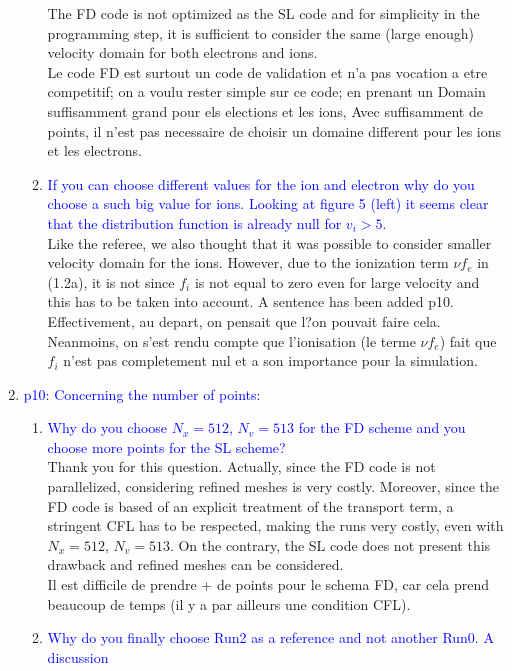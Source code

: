 \documentclass{article}
\begin{document}
\begin{enumerate}
\begin{enumerate}
The FD code is not optimized as the SL code and for simplicity in the programming step, 
it is sufficient to consider the same (large enough) velocity domain for both electrons and ions. \\
{\small Le code FD est surtout un code de validation et n'a pas vocation a etre competitif; on a voulu rester simple sur ce code; en prenant un Domain suffisamment grand pour els elections et les ions,
Avec suffisamment de points, il n'est pas necessaire de choisir un domaine different pour les ions et les electrons.}
\item \textcolor{blue}{If you can choose different values for the ion and electron why do you choose a such big value for ions. Looking at figure 5 (left) it seems clear that the distribution function is already null for $v_i > 5$.}\\
Like the referee, we also thought that it was possible to consider smaller velocity domain for the ions. However, due to the 
ionization term $\nu f_e$ in (1.2a), it is not since $f_i$ is not equal to zero even for large velocity and this has to be taken into account. 
A sentence has been added p10. \\
{\small Effectivement, au depart, on pensait que l?on pouvait faire cela. Neanmoins, on s'est rendu compte que l'ionisation 
(le terme $\nu f_e$) fait que $f_i$ n'est pas completement nul et a son importance pour la simulation.}
\end{enumerate}
    \item \textcolor{blue}{p10: Concerning the number of points:}
    \begin{enumerate}
    \item \textcolor{blue}{Why do you choose $N_x=512$, $N_v=513$ for the FD scheme and you choose more points
for the SL scheme?}\\ 
Thank you for this question. Actually, since the FD code is not parallelized, considering refined meshes is very costly. 
Moreover, since the FD code is based of an explicit treatment of the transport term, a stringent CFL has to be respected, making the 
runs very costly, even with $N_x=512$, $N_v=513$. On the contrary, the SL code does not present this drawback and 
refined meshes can be considered. \\
{\small Il est difficile de prendre + de points pour le schema FD, car cela prend beaucoup de temps (il y a par ailleurs une condition CFL).}
\item \textcolor{blue}{Why do you finally choose Run2 as a reference and not another Run0. A discussion
}
\end{enumerate}
\end{enumerate}
\end{document}
